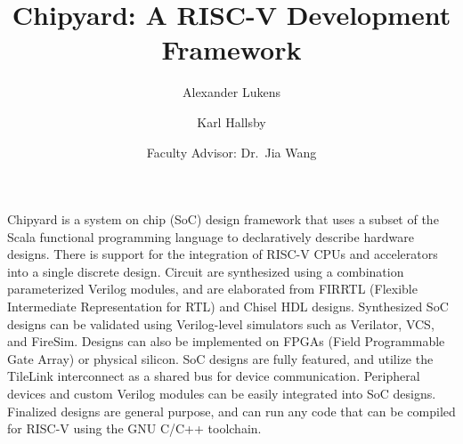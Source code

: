\documentclass[12pt,letterpaper,final,twoside,notitlepage]{article}
\title{Chipyard: A RISC-V Development Framework}
\author{Alexander Lukens \and Karl Hallsby \and Faculty Advisor: Dr.\ Jia Wang}
\date{\DTMdisplaydate{2021}{4}{9}{-1}} %
\begin{document}
\maketitle
{} %

\nocite{chipyard}

Chipyard is a system on chip (SoC) design framework that uses a subset of the Scala functional programming language to declaratively describe hardware designs. 
There is support for the integration of RISC-V CPUs and accelerators into a single discrete design. 
Circuit are synthesized using a combination parameterized Verilog modules, and are elaborated from FIRRTL (Flexible Intermediate Representation for RTL) and Chisel HDL designs. 
Synthesized SoC designs can be validated using Verilog-level simulators such as Verilator, VCS, and FireSim. 
Designs can also be implemented on FPGAs (Field Programmable Gate Array) or physical silicon. 
SoC designs are fully featured, and utilize the TileLink interconnect as a shared bus for device communication. 
Peripheral devices and custom Verilog modules can be easily integrated into SoC designs.
Finalized designs are general purpose, and can run any code that can be compiled for RISC-V using the GNU C/C++ toolchain.


\end{document}
